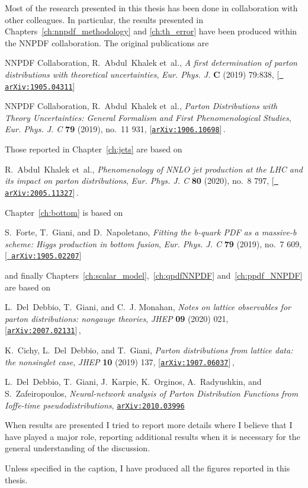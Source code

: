 
Most of the research presented in this thesis has been done in collaboration with other colleagues.
In particular, the results presented in Chapters~\ref{ch:nnpdf_methodology} and \ref{ch:th_error}
have been produced within the NNPDF collaboration. The original publications are

NNPDF Collaboration, R.~Abdul~Khalek et~al., {\it {A first determination
  of parton distributions with theoretical uncertainties}},  {\em Eur. Phys.
  J.} {\bf C} (2019) 79:838, [\href{http://arxiv.org/abs/1905.04311}{{\tt
  arXiv:1905.04311}}]

NNPDF Collaboration, R.~Abdul~Khalek et~al., {\it {Parton Distributions
  with Theory Uncertainties: General Formalism and First Phenomenological
  Studies}},  {\em Eur. Phys. J. C} {\bf 79} (2019), no.~11 931,
  [\href{http://arxiv.org/abs/1906.10698}{{\tt arXiv:1906.10698}}]\,.


Those reported in Chapter~\ref{ch:jets} are based on 

R.~Abdul~Khalek et~al., {\it {Phenomenology of NNLO jet production at the LHC
  and its impact on parton distributions}},  {\em Eur. Phys. J. C} {\bf 80}
  (2020), no.~8 797, [\href{http://arxiv.org/abs/2005.11327}{{\tt
  arXiv:2005.11327}}]\,.

Chapter~\ref{ch:bottom} is based on

S.~Forte, T.~Giani, and D.~Napoletano, {\it {Fitting the b-quark PDF as a
  massive-b scheme: Higgs production in bottom fusion}},  {\em Eur. Phys. J. C}
  {\bf 79} (2019), no.~7 609, [\href{http://arxiv.org/abs/1905.02207}{{\tt
  arXiv:1905.02207}}]

and finally Chapters~\ref{ch:scalar_model},~\ref{ch:qpdfNNPDF} and~\ref{ch:ppdf_NNPDF} are based on

L.~Del~Debbio, T.~Giani, and C.~J. Monahan, {\it {Notes on lattice observables
  for parton distributions: nongauge theories}},  {\em JHEP} {\bf 09} (2020)
  021, [\href{http://arxiv.org/abs/2007.02131}{{\tt arXiv:2007.02131}}]\,,

K.~Cichy, L.~Del~Debbio, and T.~Giani, {\it {Parton distributions from lattice
  data: the nonsinglet case}},  {\em JHEP} {\bf 10} (2019) 137,
  [\href{http://arxiv.org/abs/1907.06037}{{\tt arXiv:1907.06037}}]\,,

L.~Del~Debbio, T.~Giani, J.~Karpie, K.~Orginos, A.~Radyushkin, and
  S.~Zafeiropoulos, {\it {Neural-network analysis of Parton Distribution
  Functions from Ioffe-time pseudodistributions}},
  \href{http://arxiv.org/abs/2010.03996}{{\tt arXiv:2010.03996}}  

When results are presented I tried to report more details where I believe that I have played a major role,
reporting additional results when it is necessary for the general understanding of the discussion. 

Unless specified in the caption, I have produced all the figures reported in this thesis.


